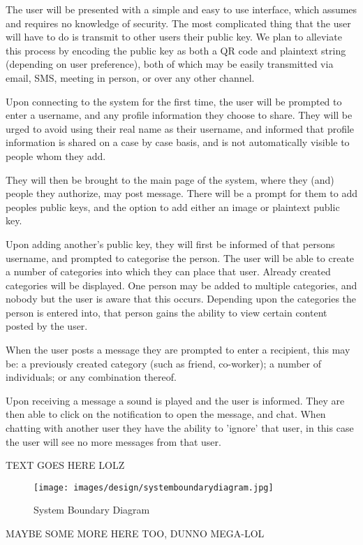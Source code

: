 The user will be presented with a simple and easy to use interface, which
assumes and requires no knowledge of security. The most complicated thing that
the user will have to do is transmit to other users their public key. We plan
to alleviate this process by encoding the public key as both a QR code and
plaintext string (depending on user preference), both of which may be easily
transmitted via email, SMS, meeting in person, or over any other channel.

Upon connecting to the system for the first time, the user will be prompted to
enter a username, and any profile information they choose to share. They will be
urged to avoid using their real name as their username, and informed that
profile information is shared on a case by case basis, and is not automatically
visible to people whom they add.

They will then be brought to the main page of the system, where they (and)
people they authorize, may post message. There will be a prompt for them to add
peoples public keys, and the option to add either an image or plaintext public
key.

Upon adding another's public key, they will first be informed of that persons
username, and prompted to categorise the person. The user will be able to create
a number of categories into which they can place that user. Already created
categories will be displayed. One person may be added to multiple categories,
and nobody but the user is aware that this occurs. Depending upon the categories
the person is entered into, that person gains the ability to view certain
content posted by the user.

When the user posts a message they are prompted to enter a recipient, this may
be: a previously created category (such as friend, co-worker); a number
of individuals; or any combination thereof.

Upon receiving a message a sound is played and the user is informed. They are
then able to click on the notification to open the message, and chat. When
chatting with another user they have the ability to 'ignore' that user, in this
case the user will see no more messages from that user.

TEXT GOES HERE LOLZ

\begin{figure}[h]
    \centering
    \texttt{[image: images/design/systemboundarydiagram.jpg]}
    \caption{System Boundary Diagram}
    \label{fig:sbd_diag}
\end{figure}

MAYBE SOME MORE HERE TOO, DUNNO MEGA-LOL
